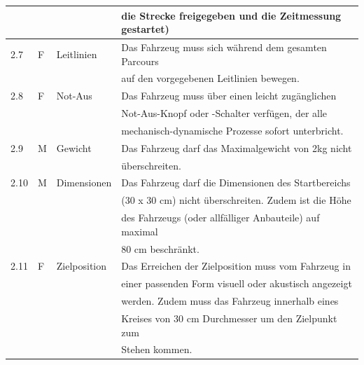 \documentclass[11pt, a4paper]{article}
\begin{document}
\begin{tabular}{|l|l|l|l|}
    & & & die Strecke freigegeben und die Zeitmessung gestartet) \\
    \hline
    2.7 & F & Leitlinien & Das Fahrzeug muss sich während dem gesamten Parcours \\
    & & & auf den vorgegebenen Leitlinien bewegen. \\
    \hline
    2.8 & F & Not-Aus & Das Fahrzeug muss über einen leicht zugänglichen \\
    & & & Not-Aus-Knopf oder -Schalter verfügen, der alle \\
    & & & mechanisch-dynamische Prozesse sofort unterbricht. \\
    \hline
    2.9 & M & Gewicht & Das Fahrzeug darf das Maximalgewicht von 2kg nicht \\
    & & & überschreiten. \\
    \hline
    2.10 & M & Dimensionen & Das Fahrzeug darf die Dimensionen des Startbereichs \\
    & & & (30 x 30 cm) nicht überschreiten. Zudem ist die Höhe \\
    & & & des Fahrzeugs (oder allfälliger Anbauteile) auf maximal \\
    & & & 80 cm beschränkt. \\
    \hline
    2.11 & F & Zielposition & Das Erreichen der Zielposition muss vom Fahrzeug in \\
    & & & einer passenden Form visuell oder akustisch angezeigt \\
    & & & werden. Zudem muss das Fahrzeug innerhalb eines \\
    & & & Kreises von 30 cm Durchmesser um den Zielpunkt zum \\
    & & & Stehen kommen. \\
    \hline
    \end{tabular}
\end{document}
